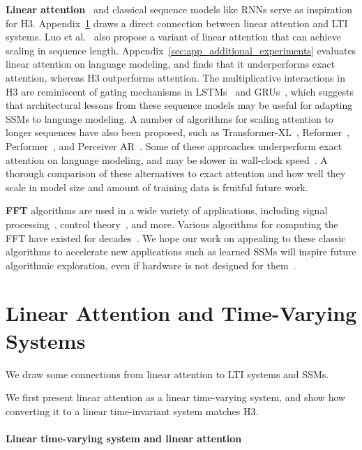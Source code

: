 \documentclass{article}
\newcommand{\hthree}{\textsc{H3}\xspace}
\begin{document}
\textbf{Linear attention}~\citep{katharopoulos2020transformers} and classical sequence models like RNNs serve as inspiration for \hthree.
Appendix~\ref{app:linear_attention} draws a direct connection between linear attention and LTI systems.
Luo et al.~\citep{luo2021stable} also propose a variant of linear attention that can achieve  scaling in sequence length.
Appendix~\ref{sec:app_additional_experiments} evaluates linear attention on language modeling, and finds that it underperforms exact attention, whereas \hthree outperforms attention.
The multiplicative interactions in \hthree are reminiscent of gating mechanisms in LSTMs~\citep{hochreiter1996lstm} and GRUs~\citep{cho2014properties}, which suggests that architectural lessons from these sequence models may be useful for adapting SSMs to language modeling.
A number of algorithms for scaling attention to longer sequences have also been proposed, such as Transformer-XL~\citep{dai2019transformer}, Reformer~\citep{kitaev2020reformer}, Performer~\citep{choromanski2020rethinking}, and Perceiver AR~\citep{hawthorne2022general}.
Some of these approaches underperform exact attention on language modeling, and may be slower in wall-clock speed~\citep{dao2022flashattention}.
A thorough comparison of these alternatives to exact attention and how well they scale in model size and amount of training data is fruitful future work.

\textbf{FFT} algorithms are used in a wide variety of applications, including signal processing~\citep{oppenheim1978applications}, control theory~\citep{brogan1974modern}, and more.
Various algorithms for computing the FFT have existed for decades~\citep{oppenheim2001discrete}.
We hope our work on appealing to these classic algorithms to accelerate new applications such as learned SSMs will inspire future algorithmic exploration, even if hardware is not designed for them~\citep{hooker2021hardware}.

 \section{Linear Attention and Time-Varying Systems}
\label{app:linear_attention}

We draw some connections from linear attention to LTI systems and SSMs.

We first present linear attention as a linear time-varying system, and show how converting it to a linear time-invariant system matches \hthree.

\paragraph{Linear time-varying system and linear attention}
\end{document}
